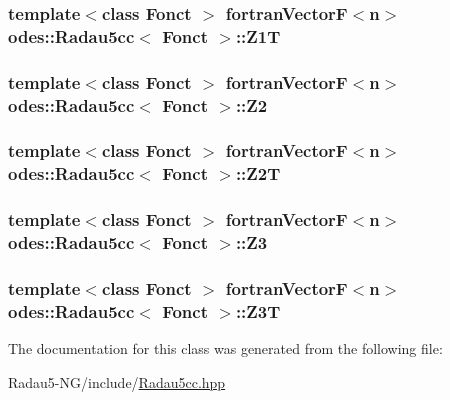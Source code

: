 \hypertarget{classodes_1_1Radau5cc_a596f99b5ee176439461a9e72da725c59}{
\subsubsection[{Z1\-T}]{\setlength{\rightskip}{0pt plus 5cm}template$<$class Fonct $>$ {\bf fortran\-Vector\-F}$<${\bf n}$>$ {\bf odes\-::\-Radau5cc}$<$ Fonct $>$\-::Z1\-T\hspace{0.3cm}{\ttfamily [protected]}}}\label{classodes_1_1Radau5cc_a596f99b5ee176439461a9e72da725c59}
\hypertarget{classodes_1_1Radau5cc_aee840f9b8646bc3a0660c3c53ab7c988}{
\subsubsection[{Z2}]{\setlength{\rightskip}{0pt plus 5cm}template$<$class Fonct $>$ {\bf fortran\-Vector\-F}$<${\bf n}$>$ {\bf odes\-::\-Radau5cc}$<$ Fonct $>$\-::Z2\hspace{0.3cm}{\ttfamily [protected]}}}\label{classodes_1_1Radau5cc_aee840f9b8646bc3a0660c3c53ab7c988}
\hypertarget{classodes_1_1Radau5cc_a4b4c5fa798698101e62b0180acd9d2a0}{
\subsubsection[{Z2\-T}]{\setlength{\rightskip}{0pt plus 5cm}template$<$class Fonct $>$ {\bf fortran\-Vector\-F}$<${\bf n}$>$ {\bf odes\-::\-Radau5cc}$<$ Fonct $>$\-::Z2\-T\hspace{0.3cm}{\ttfamily [protected]}}}\label{classodes_1_1Radau5cc_a4b4c5fa798698101e62b0180acd9d2a0}
\hypertarget{classodes_1_1Radau5cc_a5b34e13256e93e89d9e8e5a9d00c9431}{
\subsubsection[{Z3}]{\setlength{\rightskip}{0pt plus 5cm}template$<$class Fonct $>$ {\bf fortran\-Vector\-F}$<${\bf n}$>$ {\bf odes\-::\-Radau5cc}$<$ Fonct $>$\-::Z3\hspace{0.3cm}{\ttfamily [protected]}}}\label{classodes_1_1Radau5cc_a5b34e13256e93e89d9e8e5a9d00c9431}
\hypertarget{classodes_1_1Radau5cc_a5f581024591f9a6b4097994b8a9525a1}{
\subsubsection[{Z3\-T}]{\setlength{\rightskip}{0pt plus 5cm}template$<$class Fonct $>$ {\bf fortran\-Vector\-F}$<${\bf n}$>$ {\bf odes\-::\-Radau5cc}$<$ Fonct $>$\-::Z3\-T\hspace{0.3cm}{\ttfamily [protected]}}}\label{classodes_1_1Radau5cc_a5f581024591f9a6b4097994b8a9525a1}


The documentation for this class was generated from the following file\-:\begin{DoxyCompactItemize}
\item 
Radau5-\/\-N\-G/include/\hyperlink{Radau5cc_8hpp}{Radau5cc.\-hpp}\end{DoxyCompactItemize}
